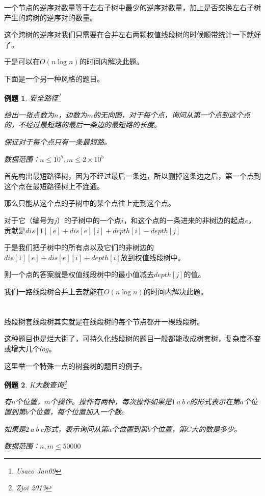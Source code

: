 \documentclass[a4paper]{article}
\newcommand{\kai}{\CJKfamily{kai}}
\newtheorem{problem}{例题}
\begin{document}
一个节点的逆序对数量等于左右子树中最少的逆序对数量，加上是否交换左右子树产生的跨树的逆序对的数量。

这个跨树的逆序对我们只需要在合并左右两颗权值线段树的时候顺带统计一下就好了。

于是可以在$O(n\log n)$的时间内解决此题。

\bigskip

下面是一个另一种风格的题目。

\begin{problem}
  安全路径\footnote{Usaco Jan09}

  给出一张点数为$n$，边数为$m$的无向图，对于每个点，询问从第一个点到这个点的，不经过最短路的最后一条边的最短路的长度。

  保证对于每个点只有一条最短路。

  数据范围：$n\leq 10^5,m\leq 2\times 10^5$
\end{problem}

首先构出最短路径树，因为不经过最后一条边，所以删掉这条边之后，第一个点到这个点在最短路径树上不连通。

那么只能从这个点的子树中的某个点往上走到这个点。

对于它（编号为$j$）的子树中的一个点$i$，和这个点的一条进来的非树边的起点$e$，贡献是$dis[1][e]+dis[e][i]+depth[i]-depth[j]$

于是我们把子树中的所有点以及它们的非树边的$dis[1][e]+dis[e][i]+depth[i]$放到权值线段树中。

则一个点的答案就是权值线段树中的最小值减去$depth[j]$的值。

我们一路线段树合并上去就能在$O(n\log n)$的时间内解决此题。

\section{\kai{线段树套线段树的基础应用}}

线段树套线段树其实就是在线段树的每个节点都开一棵线段树。

这种题目也是烂大街了，可持久化线段树的题目一般都能改成树套树，复杂度不变或增大几个$log$。

这里举一个特殊一点的树套树的题目的例子。

\begin{problem}
  K大数查询\footnote{Zjoi 2013}

  有$n$个位置，$m$个操作。操作有两种，每次操作如果是$1\ a\ b\ c$的形式表示在第$a$个位置到第$b$个位置，每个位置加入一个数$c$

  如果是$2\ a\ b\ c$形式，表示询问从第$a$个位置到第$b$个位置，第$C$大的数是多少。

  数据范围：$n,m\leq 50000$
\end{problem}
\end{document}
